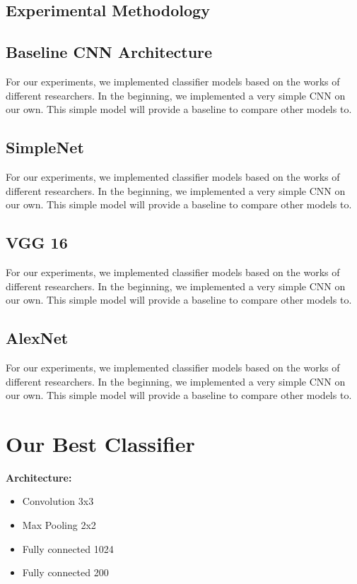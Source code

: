 \documentclass[10pt]{article} %
\begin{document}
	\subsection{Experimental Methodology}
	
	\subsection{Baseline CNN Architecture}
	
	For our experiments, we implemented classifier models based on the works of different researchers. In the beginning, we implemented a very simple CNN on our own. This simple model will provide a baseline to compare other models to.
	
	\subsection{SimpleNet}
	
	For our experiments, we implemented classifier models based on the works of different researchers. In the beginning, we implemented a very simple CNN on our own. This simple model will provide a baseline to compare other models to.
	
	\subsection{VGG 16}
	
	For our experiments, we implemented classifier models based on the works of different researchers. In the beginning, we implemented a very simple CNN on our own. This simple model will provide a baseline to compare other models to.
	
	\subsection{AlexNet}
	
	For our experiments, we implemented classifier models based on the works of different researchers. In the beginning, we implemented a very simple CNN on our own. This simple model will provide a baseline to compare other models to.
	
	\section{Our Best Classifier}
	
	\begin{tcolorbox}
		\textbf{Architecture:}
		\begin{itemize}
			\setlength\itemsep{-0.3em}
			\item Convolution 3x3
			\item Max Pooling 2x2
			\item Fully connected 1024
			\item Fully connected 200
		\end{itemize}
	\end{tcolorbox}
	
\end{document}
